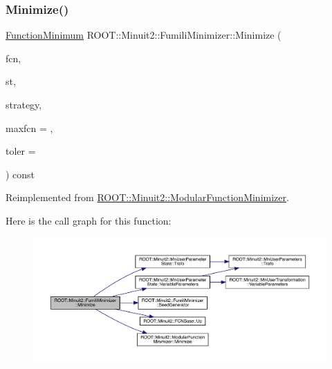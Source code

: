 \subsubsection{\texorpdfstring{Minimize()}{Minimize()}\hspace{0.1cm}{\footnotesize\ttfamily [3/22]}}
{\footnotesize\ttfamily \mbox{\hyperlink{classROOT_1_1Minuit2_1_1FunctionMinimum}{Function\+Minimum}} R\+O\+O\+T\+::\+Minuit2\+::\+Fumili\+Minimizer\+::\+Minimize (\begin{DoxyParamCaption}\item[{const \mbox{\hyperlink{classROOT_1_1Minuit2_1_1FCNGradientBase}{F\+C\+N\+Gradient\+Base}} \&}]{fcn,  }\item[{const \mbox{\hyperlink{classROOT_1_1Minuit2_1_1MnUserParameterState}{Mn\+User\+Parameter\+State}} \&}]{st,  }\item[{const \mbox{\hyperlink{classROOT_1_1Minuit2_1_1MnStrategy}{Mn\+Strategy}} \&}]{strategy,  }\item[{unsigned int}]{maxfcn = {},  }\item[{double}]{toler = {} }\end{DoxyParamCaption}) const\hspace{0.3cm}{\ttfamily [virtual]}}



Reimplemented from \mbox{\hyperlink{classROOT_1_1Minuit2_1_1ModularFunctionMinimizer_a2e1e21161544b931511204cdedac914d}{R\+O\+O\+T\+::\+Minuit2\+::\+Modular\+Function\+Minimizer}}.

Here is the call graph for this function\+:\nopagebreak
\begin{figure}[H]
\begin{center}
\leavevmode
\includegraphics[width=350pt]{db/da1/classROOT_1_1Minuit2_1_1FumiliMinimizer_afe0f09e5e093e65ac8fadc13c459ad5c_cgraph}
\end{center}
\end{figure}
\mbox{\label{classROOT_1_1Minuit2_1_1FumiliMinimizer_a2bffd3a7c3090b841f8c23248b83b16e}} 

